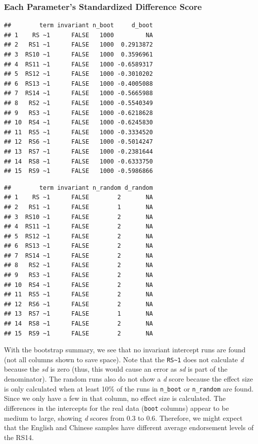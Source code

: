 \documentclass[
  man]{apa7}
\begin{document}
\subsubsection{Each Parameter's Standardized Difference Score}\label{each-parameters-standardized-difference-score}

\begin{verbatim}
##        term invariant n_boot     d_boot
## 1    RS ~1      FALSE   1000         NA
## 2   RS1 ~1      FALSE   1000  0.2913872
## 3  RS10 ~1      FALSE   1000  0.3596961
## 4  RS11 ~1      FALSE   1000 -0.6589317
## 5  RS12 ~1      FALSE   1000 -0.3010202
## 6  RS13 ~1      FALSE   1000 -0.4005088
## 7  RS14 ~1      FALSE   1000 -0.5665988
## 8   RS2 ~1      FALSE   1000 -0.5540349
## 9   RS3 ~1      FALSE   1000 -0.6218628
## 10  RS4 ~1      FALSE   1000 -0.6245830
## 11  RS5 ~1      FALSE   1000 -0.3334520
## 12  RS6 ~1      FALSE   1000 -0.5014247
## 13  RS7 ~1      FALSE   1000 -0.2381644
## 14  RS8 ~1      FALSE   1000 -0.6333750
## 15  RS9 ~1      FALSE   1000 -0.5986866
\end{verbatim}

\begin{verbatim}
##        term invariant n_random d_random
## 1    RS ~1      FALSE        2       NA
## 2   RS1 ~1      FALSE        1       NA
## 3  RS10 ~1      FALSE        2       NA
## 4  RS11 ~1      FALSE        2       NA
## 5  RS12 ~1      FALSE        2       NA
## 6  RS13 ~1      FALSE        2       NA
## 7  RS14 ~1      FALSE        2       NA
## 8   RS2 ~1      FALSE        2       NA
## 9   RS3 ~1      FALSE        2       NA
## 10  RS4 ~1      FALSE        2       NA
## 11  RS5 ~1      FALSE        2       NA
## 12  RS6 ~1      FALSE        2       NA
## 13  RS7 ~1      FALSE        1       NA
## 14  RS8 ~1      FALSE        2       NA
## 15  RS9 ~1      FALSE        2       NA
\end{verbatim}

With the bootstrap summary, we see that no invariant intercept runs are found (not all columns shown to save space). Note that the \texttt{RS\textasciitilde{}1} does not calculate \emph{d} because the \emph{sd} is zero (thus, this would cause an error as \emph{sd} is part of the denominator). The random runs also do not show a \emph{d} score because the effect size is only calculated when at least 10\% of the runs in \texttt{n\_boot} or \texttt{n\_random} are found. Since we only have a few in that column, no effect size is calculated. The differences in the intercepts for the real data (\texttt{boot} columns) appear to be medium to large, showing \emph{d} scores from 0.3 to 0.6. Therefore, we might expect that the English and Chinese samples have different average endorsement levels of the RS14.
\end{document}
